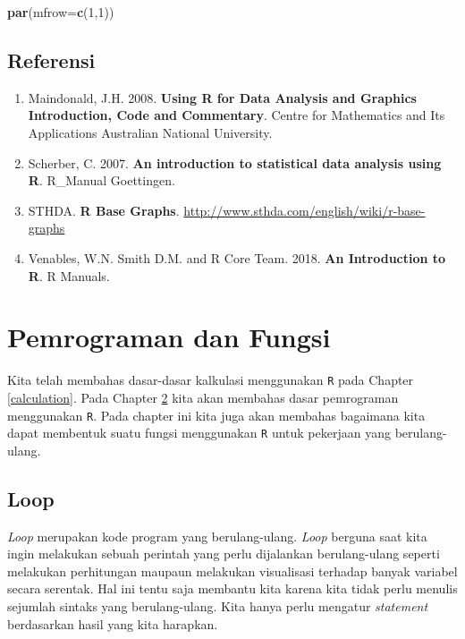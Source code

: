\documentclass[]{book}
\newenvironment{Shaded}{\begin{snugshade}}{\end{snugshade}}
\newcommand{\DataTypeTok}[1]{\textcolor[rgb]{0.13,0.29,0.53}{#1}}
\newcommand{\DecValTok}[1]{\textcolor[rgb]{0.00,0.00,0.81}{#1}}
\newcommand{\KeywordTok}[1]{\textcolor[rgb]{0.13,0.29,0.53}{\textbf{#1}}}
\newcommand{\NormalTok}[1]{#1}
\providecommand{\tightlist}{%
  \setlength{\itemsep}{0pt}\setlength{\parskip}{0pt}}
\theoremstyle{definition}
\theoremstyle{definition}
\theoremstyle{definition}
\theoremstyle{remark}
\begin{document}
\begin{Shaded}
\begin{Highlighting}[]
\KeywordTok{par}\NormalTok{(}\DataTypeTok{mfrow=}\KeywordTok{c}\NormalTok{(}\DecValTok{1}\NormalTok{,}\DecValTok{1}\NormalTok{))}
\end{Highlighting}
\end{Shaded}

\hypertarget{referensi-2}{%
\section{Referensi}\label{referensi-2}}

\begin{enumerate}
\def\labelenumi{\arabic{enumi}.}
\tightlist
\item
  Maindonald, J.H. 2008. \textbf{Using R for Data Analysis and Graphics Introduction, Code and Commentary}. Centre for Mathematics and Its Applications Australian National University.
\item
  Scherber, C. 2007. \textbf{An introduction to statistical data analysis using R}. R\_Manual Goettingen.
\item
  STHDA. \textbf{R Base Graphs}. \url{http://www.sthda.com/english/wiki/r-base-graphs}
\item
  Venables, W.N. Smith D.M. and R Core Team. 2018. \textbf{An Introduction to R}. R Manuals.
\end{enumerate}

\hypertarget{programmingandfunction}{%
\chapter{Pemrograman dan Fungsi}\label{programmingandfunction}}

Kita telah membahas dasar-dasar kalkulasi menggunakan \texttt{R} pada Chapter \ref{calculation}. Pada Chapter \ref{programmingandfunction} kita akan membahas dasar pemrograman menggunakan \texttt{R}. Pada chapter ini kita juga akan membahas bagaimana kita dapat membentuk suatu fungsi menggunakan \texttt{R} untuk pekerjaan yang berulang-ulang.

\hypertarget{loop}{%
\section{Loop}\label{loop}}

\emph{Loop} merupakan kode program yang berulang-ulang. \emph{Loop} berguna saat kita ingin melakukan sebuah perintah yang perlu dijalankan berulang-ulang seperti melakukan perhitungan maupaun melakukan visualisasi terhadap banyak variabel secara serentak. Hal ini tentu saja membantu kita karena kita tidak perlu menulis sejumlah sintaks yang berulang-ulang. Kita hanya perlu mengatur \emph{statement} berdasarkan hasil yang kita harapkan.
\end{document}
